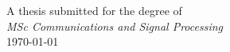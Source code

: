 \begin{titlepage}

{\large A thesis submitted for the degree of}\\[0.5cm]
{\large \emph{MSc Communications and Signal Processing}}\\[0.5cm]
{\large \today}\\[2cm] %

\vfill %

\end{titlepage} 